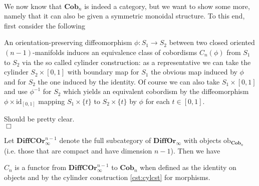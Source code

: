 \\\\\\\\\\\\
We now know that $\mathbf{Cob}_{n}$ is indeed a category, but we want to show some more, namely that it can also be given a symmetric monoidal structure. To this end, first consider the following
\\
\begin{cst}
\label{cst:cylcst}
An orientation-preserving diffeomorphism $\phi \colon S_{1} \to S_{2}$ between two closed oriented $(n - 1)$-manifolds induces an equivalence class of cobordisms $C_{n}(\phi)$ from $S_{1}$ to $S_{2}$ via the so called cylinder construction: as a representative we can take the cylinder $S_{2} \times [0,1]$ with boundary map for $S_{1}$ the obvious map induced by $\phi$ and for $S_{2}$ the one induced by the identity. Of course we can also take $S_{1} \times [0,1]$ and use $\phi^{-1}$ for $S_{2}$ which yields an equivalent cobordism by the diffeomorphism $\phi \times \mathrm{id}_{[0,1]}$ mapping $S_{1} \times \lbrace t \rbrace$ to $S_{2} \times \lbrace t \rbrace$ by $\phi$ for each $t \in [0,1]$.
\end{cst}
\begin{prf}
Should be pretty clear.
\\
\phantom{proven}
\hfill
$\Box$
\end{prf}
Let $\mathbf{DiffCOr}_{\infty}^{n - 1}$ denote the full subcategory of $\mathbf{DiffOr}_{\infty}$ with objects $\mathrm{ob}_{\mathbf{Cob}_{n}}$ (i.e. those that are compact and have dimension $n - 1$). Then we have
\\
\begin{lem}
$C_{n}$ is a functor from $\mathbf{DiffCOr}_{\infty}^{n - 1}$ to $\mathbf{Cob}_{n}$ when defined as the identity on objects and by the cylinder construction \ref{cst:cylcst} for morphisms.
\end{lem}
